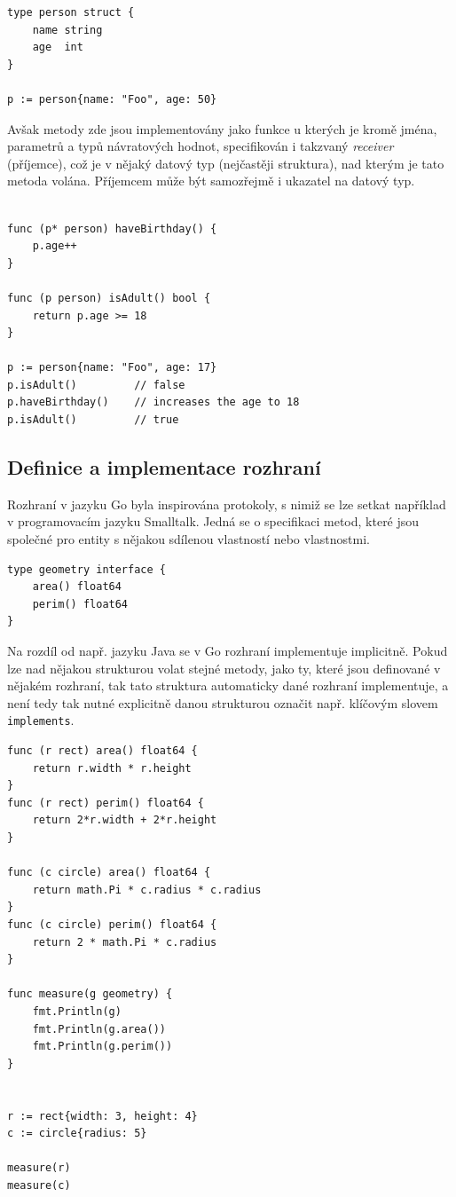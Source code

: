 \documentclass[12pt, a4paper]{article}
\begin{document}
\begin{lstlisting}[caption={Definice struktur}, captionpos=b, language=Golang]
type person struct {
    name string
    age  int
}

p := person{name: "Foo", age: 50}
\end{lstlisting}

Avšak metody zde jsou implementovány jako funkce u kterých je kromě jména, parametrů a typů návratových hodnot, specifikován i takzvaný \textit{receiver} (příjemce), což je v nějaký datový typ (nejčastěji struktura), nad kterým je tato metoda volána. Příjemcem může být samozřejmě i ukazatel na datový typ.

\begin{lstlisting}[caption={Volání metod nad strukturami}, captionpos=b, language=Golang]

func (p* person) haveBirthday() {
    p.age++
}

func (p person) isAdult() bool {
    return p.age >= 18
}

p := person{name: "Foo", age: 17}
p.isAdult()         // false
p.haveBirthday()    // increases the age to 18
p.isAdult()         // true
\end{lstlisting}

\subsection{Definice a implementace rozhraní}
Rozhraní v jazyku Go byla inspirována protokoly, s nimiž se lze setkat například v programovacím jazyku Smalltalk. Jedná se o specifikaci metod, které jsou společné pro entity s nějakou sdílenou vlastností nebo vlastnostmi.

\begin{lstlisting}[caption={Definice rozhraní}, captionpos=b, language=Golang]
type geometry interface {
    area() float64
    perim() float64
}
\end{lstlisting}

Na rozdíl od např. jazyku Java se v Go rozhraní implementuje implicitně. Pokud lze nad nějakou strukturou volat stejné metody, jako ty, které jsou definované v nějakém rozhraní, tak tato struktura automaticky dané rozhraní implementuje, a není tedy tak nutné explicitně danou strukturou označit např. klíčovým slovem \texttt{implements}.


\begin{lstlisting}[caption={Implementace rozhraní \texttt{geometry}}, captionpos=b, language=Golang]
func (r rect) area() float64 {
    return r.width * r.height
}
func (r rect) perim() float64 {
    return 2*r.width + 2*r.height
}

func (c circle) area() float64 {
    return math.Pi * c.radius * c.radius
}
func (c circle) perim() float64 {
    return 2 * math.Pi * c.radius
}

func measure(g geometry) {
    fmt.Println(g)
    fmt.Println(g.area())
    fmt.Println(g.perim())
}


r := rect{width: 3, height: 4}
c := circle{radius: 5}

measure(r)
measure(c)

\end{lstlisting}
\end{document}
